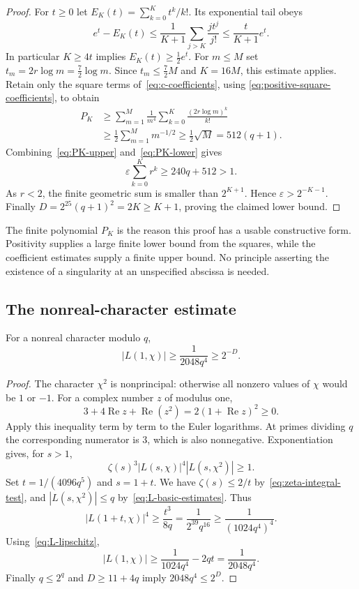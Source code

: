 \begin{proof}
For $t\geq0$ let $E_K(t)=\sum_{k=0}^Kt^k/k!$.  Its exponential tail obeys
\[
 e^t-E_K(t)
 \leq\frac1{K+1}\sum_{j>K}\frac{jt^j}{j!}
 \leq\frac{t}{K+1}e^t.
\]
In particular $K\geq4t$ implies $E_K(t)\geq\tfrac12e^t$.
For $m\leq M$ set $t_m=2r\log m=\tfrac72\log m$.  Since
$t_m\leq\tfrac72M$ and $K=16M$, this estimate applies.  Retain only the
square terms of~\eqref{eq:c-coefficients}, using
\eqref{eq:positive-square-coefficients}, to obtain
\begin{align}
 P_K
 &\geq\sum_{m=1}^M\frac1{m^4}
                \sum_{k=0}^K\frac{(2r\log m)^k}{k!}\nonumber\\
 &\geq\frac12\sum_{m=1}^M m^{-1/2}
 \geq\frac12\sqrt M=512(q+1).
 \label{eq:PK-lower}
\end{align}
Combining~\eqref{eq:PK-upper} and~\eqref{eq:PK-lower} gives
\[
 \varepsilon\sum_{k=0}^K r^k\geq240q+512>1.
\]
As $r<2$, the finite geometric sum is smaller than $2^{K+1}$.  Hence
$\varepsilon>2^{-K-1}$.  Finally
$D=2^{25}(q+1)^2=2K\geq K+1$, proving the claimed lower bound.
\end{proof}

The finite polynomial $P_K$ is the reason this proof has a usable
constructive form.  Positivity supplies a large finite lower bound from the
squares, while the coefficient estimates supply a finite upper bound.  No
principle asserting the existence of a singularity at an unspecified
abscissa is needed.

\subsection{The nonreal-character estimate}

\begin{lemma}
\label{lem:nonreal-L-margin}
For a nonreal character modulo $q$,
\[
 |L(1,\chi)|\geq\frac1{2048q^4}\geq2^{-D}.
\]
\end{lemma}

\begin{proof}
The character $\chi^2$ is nonprincipal: otherwise all nonzero values of
$\chi$ would be $1$ or $-1$.  For a complex number $z$ of modulus one,
\[
 3+4\operatorname{Re}z+\operatorname{Re}(z^2)
   =2(1+\operatorname{Re}z)^2\geq0.
\]
Apply this inequality term by term to the Euler logarithms.  At primes
dividing $q$ the corresponding numerator is $3$, which is also nonnegative.
Exponentiation gives, for $s>1$,
\begin{equation}
 \zeta(s)^3|L(s,\chi)|^4|L(s,\chi^2)|\geq1.
 \label{eq:nonreal-product-positive}
\end{equation}
Set $t=1/(4096q^5)$ and $s=1+t$.  We have
$\zeta(s)\leq2/t$ by~\eqref{eq:zeta-integral-test}, and
$|L(s,\chi^2)|\leq q$ by~\eqref{eq:L-basic-estimates}.  Thus
\[
 |L(1+t,\chi)|^4\geq\frac{t^3}{8q}
     =\frac1{2^{39}q^{16}}\geq\frac1{(1024q^4)^4}.
\]
Using~\eqref{eq:L-lipschitz},
\[
 |L(1,\chi)|
 \geq\frac1{1024q^4}-2qt
 =\frac1{2048q^4}.
\]
Finally $q\leq2^q$ and $D\geq11+4q$ imply
$2048q^4\leq2^D$.
\end{proof}

